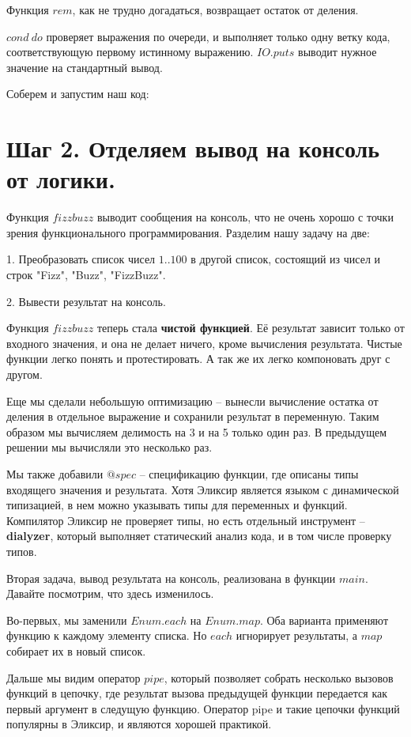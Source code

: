 Функция $rem$, как не трудно догадаться, возвращает остаток от деления.

$cond\ do$ проверяет выражения по очереди, и выполняет только одну ветку кода, соответствующую первому истинному выражению. $IO.puts$ выводит нужное значение на стандартный вывод.

Соберем и запустим наш код:


\section{Шаг 2. Отделяем вывод на консоль от логики.}

Функция $fizzbuzz$ выводит сообщения на консоль, что не очень хорошо с точки зрения функционального программирования. Разделим нашу задачу на две:

1. Преобразовать список чисел $1..100$ в другой список, состоящий из чисел и строк "Fizz", "Buzz", "FizzBuzz".

2. Вывести результат на консоль.



Функция $fizzbuzz$ теперь стала \textbf{чистой функцией}. Её результат зависит только от входного значения, и она не делает ничего, кроме вычисления результата. Чистые функции легко понять и протестировать. А так же их легко компоновать друг с другом.

Еще мы сделали небольшую оптимизацию -- вынесли вычисление остатка от деления в отдельное выражение и сохранили результат в переменную. Таким образом мы вычисляем делимость на 3 и на 5 только один раз. В предыдущем решении мы вычисляли это несколько раз.

Мы также добавили $@spec$ -- спецификацию функции, где описаны типы входящего значения и результата. Хотя Эликсир является языком с динамической типизацией, в нем можно указывать типы для переменных и функций. Компилятор Эликсир не проверяет типы, но есть отдельный инструмент -- \textbf{dialyzer}, который выполняет статический анализ кода, и в том числе проверку типов.

Вторая задача, вывод результата на консоль, реализована в функции $main$. Давайте посмотрим, что здесь изменилось. 

Во-первых, мы заменили $Enum.each$ на $Enum.map$. Оба варианта применяют функцию к каждому элементу списка. Но $each$ игнорирует результаты, а $map$ собирает их в новый список.

Дальше мы видим оператор $pipe$, который позволяет собрать несколько вызовов функций в цепочку, где результат вызова предыдущей функции передается как первый аргумент в следущую функцию. Оператор pipe и такие цепочки функций популярны в Эликсир, и являются хорошей практикой.

